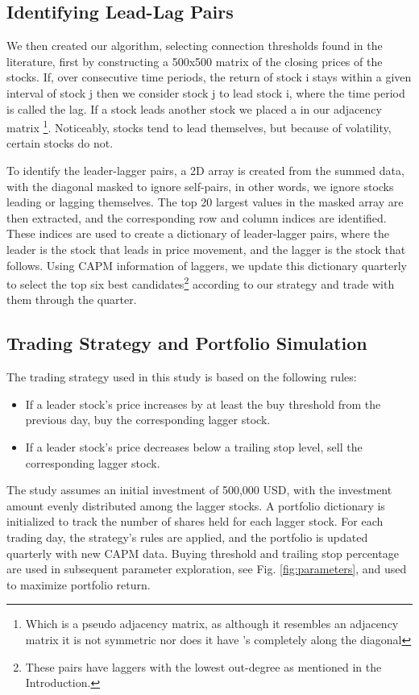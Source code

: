 \documentclass{article}
\begin{document}
\subsection{Identifying Lead-Lag Pairs}
We then created our algorithm, selecting connection thresholds found in the literature, first by constructing a 500x500 matrix of the closing prices of the stocks. If, over consecutive time periods, the return of stock {\selectfont
i} stays within a given interval of stock {\selectfont
j} then we consider stock {\selectfont
j} to lead stock {\selectfont
i}, where the time period is called the lag. If a stock leads another stock we placed a {} in our adjacency matrix \footnote{Which is a pseudo adjacency matrix, as although it resembles an adjacency matrix it is not symmetric nor does it have {}'s completely along the diagonal}. Noticeably, stocks tend to lead themselves, but because of volatility, certain stocks do not. 

To identify the leader-lagger pairs, a 2D array is created from the summed data, with the diagonal masked to ignore self-pairs, in other words, we ignore stocks leading or lagging themselves. The top 20 largest values in the masked array are then extracted, and the corresponding row and column indices are identified. These indices are used to create a dictionary of leader-lagger pairs, where the leader is the stock that leads in price movement, and the lagger is the stock that follows. Using CAPM information of laggers, we update this dictionary quarterly to select the top six best candidates\footnote{These pairs have laggers with the lowest out-degree as mentioned in the Introduction.} according to our strategy and trade with them through the quarter. 
\subsection{Trading Strategy and Portfolio Simulation}
The trading strategy used in this study is based on the following rules:
\begin{itemize}
    \item If a leader stock's price increases by at least the buy threshold from the previous day, buy the corresponding lagger stock.
    \item If a leader stock's price decreases below a trailing stop level, sell the corresponding lagger stock.
\end{itemize}
The study assumes an initial investment of 500,000 USD, with the investment amount evenly distributed among the lagger stocks. A portfolio dictionary is initialized to track the number of shares held for each lagger stock. For each trading day, the strategy's rules are applied, and the portfolio is updated quarterly with new CAPM data. Buying threshold and trailing stop percentage are used in subsequent parameter exploration, see Fig. \ref{fig:parameters}, and used to maximize portfolio return.
\end{document}
